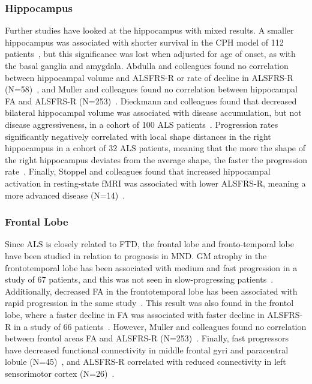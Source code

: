 \subsubsection*{Hippocampus}
Further studies have looked at the hippocampus with mixed results.
A smaller hippocampus was associated with shorter survival in the CPH model of 112 patients~\cite{westenengSubcorticalStructuresAmyotrophic2015}, but this significance was lost when adjusted for age of onset, as with the basal ganglia and amygdala.
Abdulla and colleagues found no correlation between hippocampal volume and ALSFRS-R or rate of decline in ALSFRS-R (N=58)~\cite{abdullaHippocampalDegenerationPatients2014}, and Muller and colleagues found no correlation between hippocampal FA and ALSFRS-R (N=253)~\cite{mullerLargescaleMulticentreCerebral2016}.
Dieckmann and colleagues found that decreased bilateral hippocampal volume was associated with disease accumulation, but not disease aggressiveness, in a cohort of 100 ALS patients~\cite{dieckmannCorticalSubcorticalGrey2022}.
Progression rates significantly negatively correlated with local shape distances in the right hippocampus in a cohort of 32 ALS patients, meaning that the more the shape of the right hippocampus deviates from the average shape, the faster the progression rate~\cite{taeShapeAnalysisSubcortical2020}.
Finally, Stoppel and colleagues found that increased hippocampal activation in resting-state fMRI was associated with lower ALSFRS-R, meaning a more advanced disease (N=14)~\cite{stoppelStructuralFunctionalHallmarks2014}.

\subsubsection*{Frontal Lobe}
Since ALS is closely related to FTD, the frontal lobe and fronto-temporal lobe have been studied in relation to prognosis in MND.
GM atrophy in the frontotemporal lobe has been associated with medium and fast progression in a study of 67 patients, and this was not seen in slow-progressing patients~\cite{sendaStructuralMRICorrelates2017}.
Additionally, decreased FA in the frontotemporal lobe has been associated with rapid progression in the same study~\cite{sendaStructuralMRICorrelates2017}.
This result was also found in the frontol lobe, where a faster decline in FA was associated with faster decline in ALSFRS-R in a study of 66 patients~\cite{kalraProspectiveHarmonizedMulticenter2020}.
However, Muller and colleagues found no correlation between frontol areas FA and ALSFRS-R (N=253)~\cite{mullerLargescaleMulticentreCerebral2016}.
Finally, fast progressors have decreased functional connectivity in middle frontal gyri and paracentral lobule (N=45)~\cite{trojsiRestingStateFunctional2021}, and ALSFRS-R correlated with reduced connectivity in left sensorimotor cortex (N=26)~\cite{agostaSensorimotorFunctionalConnectivity2011}.

